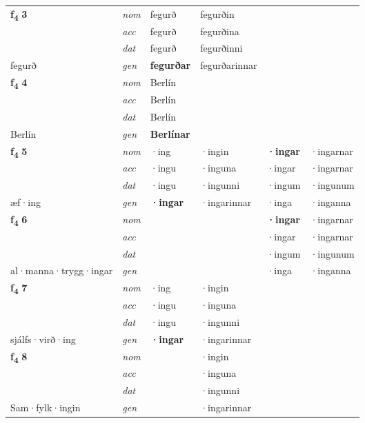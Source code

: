 \begin{longtable}[l]{X>{\footnotesize\itshape}XXXXX}
\multirow{3}{*}{{{\textbf{f{\textsubscript{4}}} \Large{\textbf{3}}}}} & nom & fegurð & fegurðin & \textbf{} &  \\*
 & acc & fegurð & fegurðina &  &  \\*
 & dat & fegurð & fegurðinni &  &  \\*
 {\footnotesize{fegurð}} & gen & \textbf{fegurðar} & fegurðarinnar &  &  \\
\cmidrule{1-6}

\multirow{3}{*}{{{\textbf{f{\textsubscript{4}}} \Large{\textbf{4}}}}} & nom & Berlín &  & \textbf{} &  \\*
 & acc & Berlín &  &  &  \\*
 & dat & Berlín &  &  &  \\*
 {\footnotesize{Berlín}} & gen & \textbf{Berlínar} &  &  &  \\
\cmidrule{1-6}

\multirow{3}{*}{{{\textbf{f{\textsubscript{4}}} \Large{\textbf{5}}}}} & nom & ·ing & ·ingin & \textbf{·ingar} & ·ingarnar \\*
 & acc & ·ingu & ·inguna & ·ingar & ·ingarnar \\*
 & dat & ·ingu & ·ingunni & ·ingum & ·ingunum \\*
 {\footnotesize{æf\allowbreak ·ing}} & gen & \textbf{·ingar} & ·ingarinnar & ·inga & ·inganna \\
\cmidrule{1-6}

\multirow{3}{*}{{{\textbf{f{\textsubscript{4}}} \Large{\textbf{6}}}}} & nom &  &  & \textbf{·ingar} & ·ingarnar \\*
 & acc &  &  & ·ingar & ·ingarnar \\*
 & dat &  &  & ·ingum & ·ingunum \\*
 {\footnotesize{al\allowbreak ·manna\allowbreak ·trygg\allowbreak ·ingar}} & gen & \textbf{} &  & ·inga & ·inganna \\
\cmidrule{1-6}

\multirow{3}{*}{{{\textbf{f{\textsubscript{4}}} \Large{\textbf{7}}}}} & nom & ·ing & ·ingin & \textbf{} &  \\*
 & acc & ·ingu & ·inguna &  &  \\*
 & dat & ·ingu & ·ingunni &  &  \\*
 {\footnotesize{sjálfs\allowbreak ·virð\allowbreak ·ing}} & gen & \textbf{·ingar} & ·ingarinnar &  &  \\
\cmidrule{1-6}

\multirow{3}{*}{{{\textbf{f{\textsubscript{4}}} \Large{\textbf{8}}}}} & nom &  & ·ingin & \textbf{} &  \\*
 & acc &  & ·inguna &  &  \\*
 & dat &  & ·ingunni &  &  \\*
 {\footnotesize{Sam\allowbreak ·fylk\allowbreak ·ingin}} & gen & \textbf{} & ·ingarinnar &  &  \\
\cmidrule{1-6}


\end{longtable}
